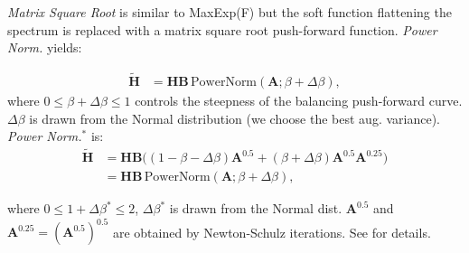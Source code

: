 \vspace{0.1cm}
\noindent
{\em{Matrix Square Root}} is similar to MaxExp(F)  but the soft function flattening the spectrum is replaced with a matrix square root push-forward function. {\em Power Norm.} yields:
%
%

\vspace{-0.3cm}
\begin{equation}
\begin{aligned}
\widetilde{\mathbf{H}}&=\mathbf{H}\mathbf{B}\,\text{PowerNorm}(\mathbf{A}; \beta\!+\!\Delta{\beta}),
\end{aligned}
\end{equation}
%
%
where $0\leq\beta\!+\Delta{\beta}\!\leq 1$ controls the steepness of the balancing push-forward curve. $\Delta{\beta}$ is %
drawn from the Normal distribution (we choose the best aug. variance). {\em Power Norm.$^*$} is:
%
%
\vspace{-0.3cm}
\begin{align}
\!\!\!\!\widetilde{\mathbf{H}}&=\mathbf{H}\mathbf{B}\big( (1-\beta\!-\!\Delta{\beta})\mathbf{A}^{0.5} +(\beta\!+\!\Delta{\beta})\mathbf{A}^{0.5}\mathbf{A}^{0.25}\big)\nonumber\\
&=\mathbf{H}\mathbf{B}\,\text{PowerNorm}(\mathbf{A}; \beta\!+\!\Delta{\beta}),
\end{align}
\vspace{-0.3cm}
%
%

\noindent
where $0\!\leq\!1\!+\Delta{\beta}^*\!\leq\!2$,  $\Delta{\beta}^*$ is drawn  from the Normal dist. 
%
%
%
%
 $\mathbf{A}^{0.5}$ and $\mathbf{A}^{0.25}\!=\!\left(\mathbf{A}^{0.5}\right)^{0.5}\!$ are obtained by Newton-Schulz iterations. See   for details.



